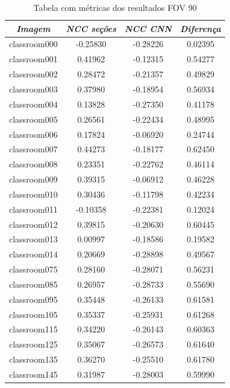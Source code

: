 \documentclass[cic,tc]{iiufrgs}
\begin{document}
\begin{table}[h]
    \caption{Tabela com métricas dos resultados FOV 90\degree}
    \centering
        \begin{tabular}{c|c|c|c}
          \hline
          \textit{Imagem} & \textit{NCC seções} & \textit{NCC CNN} & \textit{Diferença} \\
          \hline
          \hline
          classroom000 & -0.25830 & -0.28226 & 0.02395 \\
          classroom001 & 0.41962 & -0.12315 & 0.54277 \\
          classroom002 & 0.28472 & -0.21357 & 0.49829 \\
          classroom003 & 0.37980 & -0.18954 & 0.56934 \\
          classroom004 & 0.13828 & -0.27350 & 0.41178 \\
          classroom005 & 0.26561 & -0.22434 & 0.48995 \\
          classroom006 & 0.17824 & -0.06920 & 0.24744 \\
          classroom007 & 0.44273 & -0.18177 & 0.62450 \\
          classroom008 & 0.23351 & -0.22762 & 0.46114 \\
          classroom009 & 0.39315 & -0.06912 & 0.46228 \\
          classroom010 & 0.30436 & -0.11798 & 0.42234 \\
          classroom011 & -0.10358 & -0.22381 & 0.12024 \\
          classroom012 & 0.39815 & -0.20630 & 0.60445 \\
          classroom013 & 0.00997 & -0.18586 & 0.19582 \\
          classroom014 & 0.20669 & -0.28898 & 0.49567 \\
          classroom075 & 0.28160 & -0.28071 & 0.56231 \\
          classroom085 & 0.26957 & -0.28733 & 0.55690 \\
          classroom095 & 0.35448 & -0.26133 & 0.61581 \\
          classroom105 & 0.35337 & -0.25931 & 0.61268 \\
          classroom115 & 0.34220 & -0.26143 & 0.60363 \\
          classroom125 & 0.35067 & -0.26573 & 0.61640 \\
          classroom135 & 0.36270 & -0.25510 & 0.61780 \\
          classroom145 & 0.31987 & -0.28003 & 0.59990 \\

\end{tabular}
\end{table}
\end{document}
